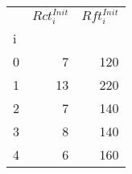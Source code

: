 \begin{tabular}{lrr}
\toprule
{} &  $Rct^{Init}_i$ &  $Rft^{Init}_i$ \\
i &                 &                 \\
\midrule
0 &               7 &             120 \\
1 &              13 &             220 \\
2 &               7 &             140 \\
3 &               8 &             140 \\
4 &               6 &             160 \\
\bottomrule
\end{tabular}
